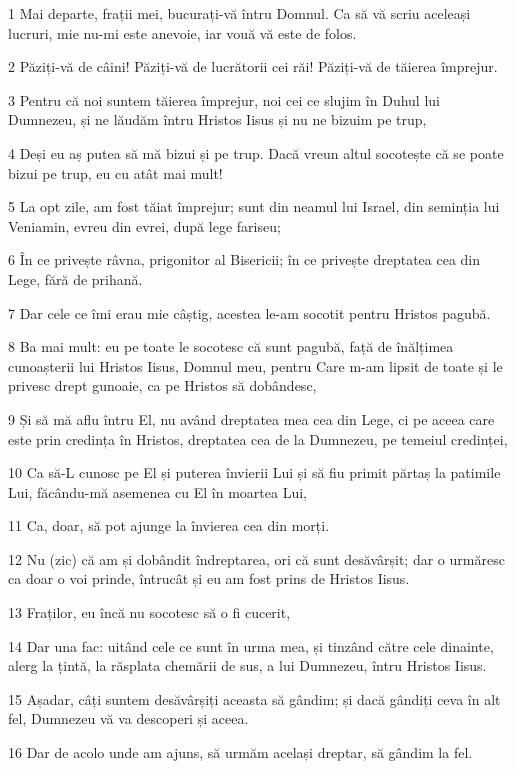 \par 1 Mai departe, frații mei, bucurați-vă întru Domnul. Ca să vă scriu aceleași lucruri, mie nu-mi este anevoie, iar vouă vă este de folos.
\par 2 Păziți-vă de câini! Păziți-vă de lucrătorii cei răi! Păziți-vă de tăierea împrejur.
\par 3 Pentru că noi suntem tăierea împrejur, noi cei ce slujim în Duhul lui Dumnezeu, și ne lăudăm întru Hristos Iisus și nu ne bizuim pe trup,
\par 4 Deși eu aș putea să mă bizui și pe trup. Dacă vreun altul socotește că se poate bizui pe trup, eu cu atât mai mult!
\par 5 La opt zile, am fost tăiat împrejur; sunt din neamul lui Israel, din seminția lui Veniamin, evreu din evrei, după lege fariseu;
\par 6 În ce privește râvna, prigonitor al Bisericii; în ce privește dreptatea cea din Lege, fără de prihană.
\par 7 Dar cele ce îmi erau mie câștig, acestea le-am socotit pentru Hristos pagubă.
\par 8 Ba mai mult: eu pe toate le socotesc că sunt pagubă, față de înălțimea cunoașterii lui Hristos Iisus, Domnul meu, pentru Care m-am lipsit de toate și le privesc drept gunoaie, ca pe Hristos să dobândesc,
\par 9 Și să mă aflu întru El, nu având dreptatea mea cea din Lege, ci pe aceea care este prin credința în Hristos, dreptatea cea de la Dumnezeu, pe temeiul credinței,
\par 10 Ca să-L cunosc pe El și puterea învierii Lui și să fiu primit părtaș la patimile Lui, făcându-mă asemenea cu El în moartea Lui,
\par 11 Ca, doar, să pot ajunge la învierea cea din morți.
\par 12 Nu (zic) că am și dobândit îndreptarea, ori că sunt desăvârșit; dar o urmăresc ca doar o voi prinde, întrucât și eu am fost prins de Hristos Iisus.
\par 13 Fraților, eu încă nu socotesc să o fi cucerit,
\par 14 Dar una fac: uitând cele ce sunt în urma mea, și tinzând către cele dinainte, alerg la țintă, la răsplata chemării de sus, a lui Dumnezeu, întru Hristos Iisus.
\par 15 Așadar, câți suntem desăvârșiți aceasta să gândim; și dacă gândiți ceva în alt fel, Dumnezeu vă va descoperi și aceea.
\par 16 Dar de acolo unde am ajuns, să urmăm același dreptar, să gândim la fel.
